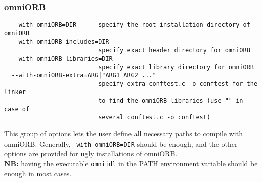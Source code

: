 





\subsubsection{omniORB}
{\footnotesize
\begin{verbatim}
  --with-omniORB=DIR      specify the root installation directory of omniORB
  --with-omniORB-includes=DIR
                          specify exact header directory for omniORB
  --with-omniORB-libraries=DIR
                          specify exact library directory for omniORB
  --with-omniORB-extra=ARG|"ARG1 ARG2 ..."
                          specify extra conftest.c -o conftest for the linker
                          to find the omniORB libraries (use "" in case of 
                          several conftest.c -o conftest)
\end{verbatim}
}
\noindent This group of options lets the user define all necessary
paths to compile with omniORB. Generally, \texttt{--with-omniORB=DIR}
should be enough, and the other options are provided for ugly
installations of omniORB.\\ \textbf{NB:} having the executable
\texttt{omniidl} in the PATH environment variable should be enough in
most cases.

